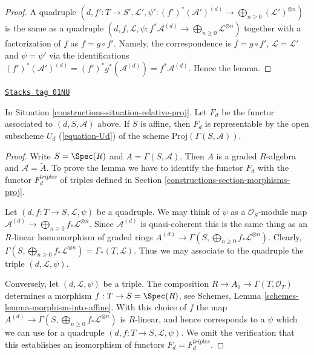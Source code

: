 \begin{proof}
A quadruple
$(d, f' : T \to S', \mathcal{L}',
\psi' : (f')^*(\mathcal{A}')^{(d)} \to
\bigoplus_{n \geq 0} (\mathcal{L}')^{\otimes n})$
is the same as a quadruple
$(d, f, \mathcal{L},
\psi : f^*\mathcal{A}^{(d)} \to
\bigoplus_{n \geq 0} \mathcal{L}^{\otimes n})$
together with a factorization of $f$ as $f = g \circ f'$. Namely,
the correspondence is $f = g \circ f'$, $\mathcal{L} = \mathcal{L}'$
and $\psi = \psi'$ via the identifications
$(f')^*(\mathcal{A}')^{(d)} = (f')^*g^*(\mathcal{A}^{(d)}) =
f^*\mathcal{A}^{(d)}$. Hence the lemma.
\end{proof}

\begin{lemma}
\label{constructions-lemma-relative-proj-affine}
\href{https://stacks.math.columbia.edu/tag/01NU}{\texttt{Stacks tag 01NU}}

In Situation \ref{constructions-situation-relative-proj}. Let $F_d$ be the functor
associated to $(d, S, \mathcal{A})$ above.
If $S$ is affine, then $F_d$ is representable by the open subscheme
$U_d$ (\ref{equation-Ud})
of the scheme $\text{Proj}(\Gamma(S, \mathcal{A}))$.
\end{lemma}

\begin{proof}
Write $S = \Spec(R)$ and $A = \Gamma(S, \mathcal{A})$.
Then $A$ is a graded $R$-algebra and $\mathcal{A} = \widetilde A$.
To prove the lemma we have to identify the functor $F_d$
with the functor $F_d^{triples}$ of triples defined in Section
\ref{constructions-section-morphisms-proj}.

\medskip\noindent
Let $(d, f : T \to S, \mathcal{L}, \psi)$ be a quadruple.
We may think of $\psi$ as a $\mathcal{O}_S$-module map
$\mathcal{A}^{(d)} \to \bigoplus_{n \geq 0} f_*\mathcal{L}^{\otimes n}$.
Since $\mathcal{A}^{(d)}$ is quasi-coherent this is the same
thing as an $R$-linear homomorphism of graded rings
$A^{(d)} \to \Gamma(S, \bigoplus_{n \geq 0} f_*\mathcal{L}^{\otimes n})$.
Clearly, $\Gamma(S, \bigoplus_{n \geq 0} f_*\mathcal{L}^{\otimes n}) =
\Gamma_*(T, \mathcal{L})$. Thus we may associate to
the quadruple the triple $(d, \mathcal{L}, \psi)$.

\medskip\noindent
Conversely, let $(d, \mathcal{L}, \psi)$ be a triple.
The composition $R \to A_0 \to \Gamma(T, \mathcal{O}_T)$
determines a morphism $f : T \to S = \Spec(R)$, see
Schemes, Lemma \ref{schemes-lemma-morphism-into-affine}.
With this choice of $f$ the map
$A^{(d)} \to \Gamma(S, \bigoplus_{n \geq 0} f_*\mathcal{L}^{\otimes n})$
is $R$-linear, and hence corresponds to a $\psi$ which we
can use for a quadruple $(d, f : T \to S, \mathcal{L}, \psi)$.
We omit the verification that this establishes an isomorphism
of functors $F_d = F_d^{triples}$.
\end{proof}

